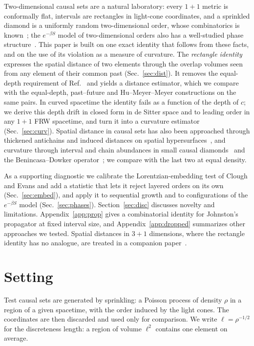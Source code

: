 \documentclass[prd,twocolumn,superscriptaddress,nofootinbib,amsmath,amssymb,floatfix]{revtex4-2}
\begin{document}
Two-dimensional causal sets are a natural laboratory: every $1+1$ metric is conformally flat, intervals are rectangles in light-cone coordinates, and a sprinkled diamond is a uniformly random two-dimensional order, whose combinatorics is known~\cite{BHS08,Surya12}; the $e^{-\beta S}$ model of two-dimensional orders also has a well-studied phase structure~\cite{BHS08,Surya12,GOS18}. This paper is built on one exact identity that follows from these facts, and on the use of its violation as a measure of curvature. The \emph{rectangle identity} expresses the spatial distance of two elements through the overlap volumes seen from any element of their common past (Sec.~\ref{sec:dist}). It removes the equal-depth requirement of Ref.~\cite{BK24} and yields a distance estimator, which we compare with the equal-depth, past--future and Hu--Meyer--Meyer constructions on the same pairs. In curved spacetime the identity fails as a function of the depth of $c$; we derive this depth drift in closed form in de Sitter space and to leading order in any $1+1$ FRW spacetime, and turn it into a curvature estimator (Sec.~\ref{sec:curv}). Spatial distance in causal sets has also been approached through thickened antichains and induced distances on spatial hypersurfaces~\cite{MRS06,MRS07,ESV19}, and curvature through interval and chain abundances in small causal diamonds~\cite{RSS13,KhetrapalSurya13} and the Benincasa--Dowker operator~\cite{BD10}; we compare with the last two at equal density.

As a supporting diagnostic we calibrate the Lorentzian-embedding test of Clough and Evans and add a statistic that lets it reject layered orders on its own (Sec.~\ref{sec:embed}), and apply it to sequential growth and to configurations of the $e^{-\beta S}$ model (Sec.~\ref{sec:phases}). Section~\ref{sec:disc} discusses novelty and limitations. Appendix~\ref{app:prop} gives a combinatorial identity for Johnston's propagator at fixed interval size, and Appendix~\ref{app:dropped} summarizes other approaches we tested. Spatial distances in $3+1$ dimensions, where the rectangle identity has no analogue, are treated in a companion paper~\cite{Embedding}.

\section{Setting}\label{sec:setting}
Test causal sets are generated by sprinkling: a Poisson process of density $\rho$ in a region of a given spacetime, with the order induced by the light cones. The coordinates are then discarded and used only for comparison. We write $\ell=\rho^{-1/2}$ for the discreteness length: a region of volume $\ell^2$ contains one element on average.
\end{document}
